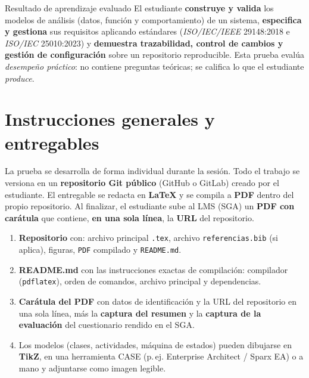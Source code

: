 \documentclass[11pt,a4paper,oneside]{article}
\begin{document}
\newpage

\begin{concepto}{Resultado de aprendizaje evaluado}
El estudiante \textbf{construye y valida} los modelos de an\'alisis (datos, funci\'on y comportamiento) de un sistema, \textbf{especifica y gestiona} sus requisitos aplicando est\'andares (\textit{ISO/IEC/IEEE} 29148:2018 e \textit{ISO/IEC} 25010:2023) y \textbf{demuestra trazabilidad, control de cambios y gesti\'on de configuraci\'on} sobre un repositorio reproducible. Esta prueba eval\'ua \emph{desempe\~no pr\'actico}: no contiene preguntas te\'oricas; se califica lo que el estudiante \emph{produce}.
\end{concepto}

\section{Instrucciones generales y entregables}

La prueba se desarrolla de forma individual durante la sesi\'on. Todo el trabajo se versiona en un \textbf{repositorio Git p\'ublico} (GitHub o GitLab) creado por el estudiante. El entregable se redacta en \textbf{LaTeX} y se compila a \textbf{PDF} dentro del propio repositorio. Al finalizar, el estudiante sube al LMS (SGA) un \textbf{PDF con car\'atula} que contiene, \textbf{en una sola l\'inea}, la \textbf{URL} del repositorio.

\begin{enumerate}[leftmargin=1.4em,itemsep=1pt,topsep=2pt]
	\item \textbf{Repositorio} con: archivo principal \texttt{.tex}, archivo \texttt{referencias.bib} (si aplica), figuras, \texttt{PDF} compilado y \texttt{README.md}.
	\item \textbf{README.md} con las instrucciones exactas de compilaci\'on: compilador (\texttt{pdflatex}), orden de comandos, archivo principal y dependencias.
	\item \textbf{Car\'atula del PDF} con datos de identificaci\'on y la URL del repositorio en una sola l\'inea, m\'as la \textbf{captura del resumen} y la \textbf{captura de la evaluaci\'on} del cuestionario rendido en el SGA.
	\item Los modelos (clases, actividades, m\'aquina de estados) pueden dibujarse en \textbf{TikZ}, en una herramienta CASE (p.\,ej. Enterprise Architect / Sparx EA) o a mano y adjuntarse como imagen legible.
\end{enumerate}
\end{document}
